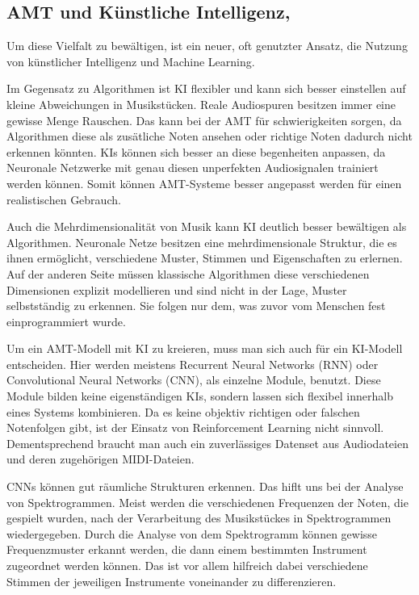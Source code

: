 \subsection{AMT und Künstliche Intelligenz,}
Um diese Vielfalt zu bewältigen, ist ein neuer, oft genutzter Ansatz,
die Nutzung von künstlicher Intelligenz und Machine Learning.

Im Gegensatz zu Algorithmen ist KI flexibler und kann sich besser
einstellen auf kleine Abweichungen in Musikstücken.
Reale Audiospuren besitzen immer eine gewisse Menge Rauschen.
Das kann bei der AMT für schwierigkeiten sorgen,
da Algorithmen diese als zusätliche Noten ansehen oder richtige Noten dadurch nicht erkennen könnten.
KIs können sich besser an diese begenheiten anpassen,
da Neuronale Netzwerke mit genau diesen unperfekten Audiosignalen trainiert werden können.
Somit können AMT-Systeme besser angepasst werden für einen realistischen Gebrauch.

Auch die Mehrdimensionalität von Musik kann KI deutlich besser bewältigen als Algorithmen.
Neuronale Netze besitzen eine mehrdimensionale Struktur, die es ihnen ermöglicht,
verschiedene Muster, Stimmen und Eigenschaften zu erlernen.
\cite{graves2007multi}
Auf der anderen Seite müssen klassische Algorithmen diese verschiedenen Dimensionen
explizit modellieren und sind nicht in der Lage, Muster selbstständig zu erkennen.
Sie folgen nur dem, was zuvor vom Menschen fest einprogrammiert wurde.

Um ein AMT-Modell mit KI zu kreieren, muss man sich auch für ein KI-Modell entscheiden.
Hier werden meistens Recurrent Neural Networks (RNN) oder Convolutional Neural Networks (CNN),
als einzelne Module, benutzt.
\cite{Boeck2012}
Diese Module bilden keine eigenständigen KIs, sondern lassen sich flexibel innerhalb eines Systems kombinieren.
Da es keine objektiv richtigen oder falschen Notenfolgen gibt, ist der Einsatz von Reinforcement Learning nicht sinnvoll.
Dementsprechend braucht man auch ein zuverlässiges Datenset aus Audiodateien und deren zugehörigen MIDI-Dateien.

CNNs können gut räumliche Strukturen erkennen.
Das hiflt uns bei der Analyse von Spektrogrammen.
Meist werden die verschiedenen Frequenzen der Noten, die gespielt wurden,
nach der Verarbeitung des Musikstückes in Spektrogrammen wiedergegeben.
Durch die Analyse von dem Spektrogramm können gewisse Frequenzmuster erkannt werden,
die dann einem bestimmten Instrument zugeordnet werden können.
Das ist vor allem hilfreich dabei verschiedene Stimmen der jeweiligen Instrumente voneinander zu differenzieren.
\cite{han2016deep}


